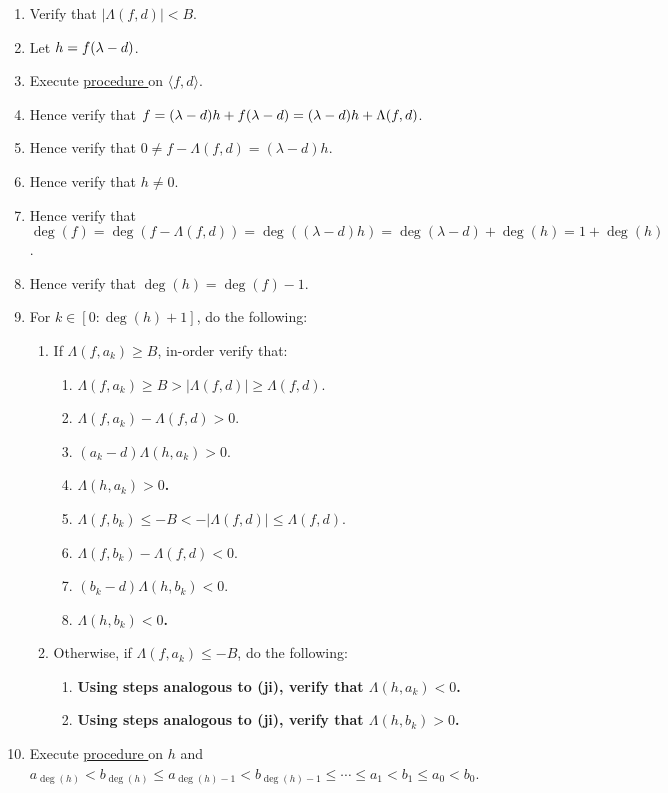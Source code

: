 \documentclass{article}
\let\div\relax\DeclareMathOperator{\div}{div}
\let\mod\relax\DeclareMathOperator{\mod}{mod}
\newcounter{procedure}[part]
\newcommand{\procedurehr}[1]{\hyperref[sec:procedure #1]{procedure \expandafter\csname procedure#1\endcsname}}
\begin{document}
\begin{multicols}{2}
\begin{enumerate}
\begin{enumerate}
						\item Verify that $\lvert\Lambda(f,d)\rvert<B$.
						\item Let $h=f\div(\lambda-d)$.
						\item Execute \procedurehr{2.79} on $\langle f,d\rangle$.
						\item Hence verify that $f=(\lambda-d)h+f\mod(\lambda-d)=(\lambda-d)h+\Lambda(f,d)$.
						\item Hence verify that $0\ne f-\Lambda(f,d)=(\lambda-d)h$.
						\item Hence verify that $h\ne 0$.
						\item Hence verify that $\deg(f)=\deg(f-\Lambda(f,d))=\deg((\lambda-d)h)=\deg(\lambda-d)+\deg(h)=1+\deg(h)$.
						\item Hence verify that $\deg(h)=\deg(f)-1$.
						\item For $k\in[0:\deg(h)+1]$, do the following:
						\begin{enumerate}
							\item If $\Lambda(f,a_k)\ge B$, in-order verify that:
							\begin{enumerate}
								\item $\Lambda(f,a_k)\ge B>\lvert\Lambda(f,d)\rvert\ge\Lambda(f,d)$.
								\item $\Lambda(f,a_k)-\Lambda(f,d)>0$.
								\item $(a_k-d)\Lambda(h,a_k)>0$.
								\item \textbf{$\Lambda(h,a_k)>0$.}
								\item $\Lambda(f,b_k)\le-B<-\lvert\Lambda(f,d)\rvert\le\Lambda(f,d)$.
								\item $\Lambda(f,b_k)-\Lambda(f,d)<0$.
								\item $(b_k-d)\Lambda(h,b_k)<0$.
								\item \textbf{$\Lambda(h,b_k)<0$.}
							\end{enumerate}
							\item Otherwise, if $\Lambda(f,a_k)\le -B$, do the following:
							\begin{enumerate}
								\item \textbf{Using steps analogous to (ji), verify that $\Lambda(h,a_k)<0$.}
								\item \textbf{Using steps analogous to (ji), verify that $\Lambda(h,b_k)>0$.}
							\end{enumerate}
						\end{enumerate}
						\item Execute \procedurehr{2.18} on $h$ and $a_{\deg(h)}<b_{\deg(h)}\le a_{\deg(h)-1}<b_{\deg(h)-1}\le\cdots\le a_1<b_1\le a_0<b_0$.

\end{enumerate}
\end{enumerate}
\end{multicols}
\end{document}
